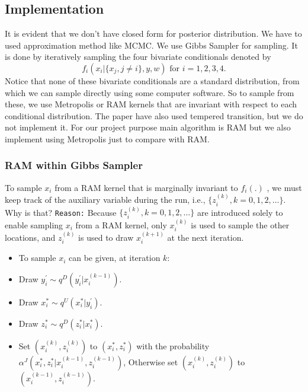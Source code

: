 \documentclass{article}
\begin{document}
\subsection*{Implementation}
It is evident that we don't have closed form for posterior distribution. We have to used approximation method like MCMC. We use Gibbs Sampler for sampling. It is done by iteratively sampling the four bivariate conditionals denoted by $$f_i (x_i | \{x_j , j \neq i\}, y, w) \text{  for } i = 1, 2, 3, 4.$$ Notice that none of these bivariate conditionals are a standard
distribution, from which we can sample directly using some computer software. So to sample from these, we use Metropolis or RAM kernels that are invariant with respect
to each conditional distribution. The paper have also used tempered transition, but we do not implement it. For our project purpose main algorithm is RAM but we also implement using Metropolis just to compare with RAM.
\subsubsection*{RAM within Gibbs Sampler}
To sample $x_i$ from a RAM kernel that is marginally invariant to $f_i(.)$ , we must
keep track of the auxiliary variable during the run, i.e., $\{z_i^{(k)}, k = 0, 1, 2,\ldots\}$. Why is that? \texttt{Reason:} Because $\{z_i^{(k)}, k = 0, 1, 2,\ldots\}$ are introduced solely to enable sampling $x_i$ from a RAM kernel, only $x_i^{(k)}$ is used to sample the other locations, and $z_i^{(k)}$ is used to draw $x_i^{(k+1)}$ at the next iteration.
\begin{tcolorbox}[colback=blue!5!white,colframe=blue,title=A RAM within Gibbs Sampler]
\begin{itemize}
    \item To sample $x_i$ can be given, at iteration $k$:
    \item Draw $y_i^{'} \sim q^D(y_i^{'}|x_i^{(k-1)})$.
    \item Draw $x_i^{*} \sim q^U(x_i^{*}|y_i^{'})$.
    \item Draw $z_i^{*} \sim q^D(z_i^{*}|x_i^{*})$.
    \item Set $(x_i^{(k)},z_i^{(k)})$ to $(x_i^{*},z_i^{*})$ with the probability $\alpha^J (x_i^{*},z_i^{*}|x_i^{(k-1)},z_i^{(k-1)})$, 
    Otherwise set $(x_i^{(k)},z_i^{(k)})$ to $(x_i^{(k-1)},z_i^{(k-1)})$.
\end{itemize}
\end{tcolorbox}
\end{document}

